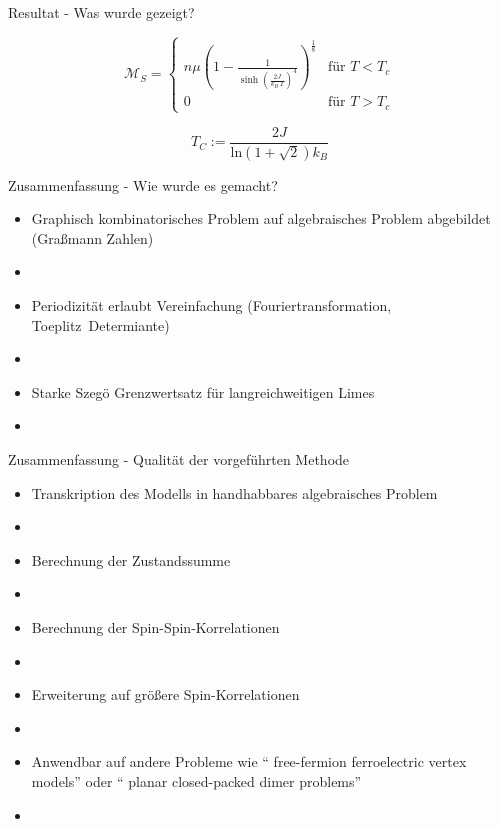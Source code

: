\documentclass[11pt]{beamer}
\renewcommand{\ln}[1]{\mathrm{ln}\left( #1 \right)}
\begin{document}
    \begin{frame}{Resultat - Was wurde gezeigt?}
    
    \begin{grayframe}[frametitle = {Spontane Magnetisierung des 2d Ising-Modells}]
    {\Large
    \begin{equation} \nonumber
    \mathcal{M}_S = \left\{ \begin{array}{cr} n \mu \left(1-\frac{1}{\sinh(\frac{2J}{k_B\,T})^4}\right)^{\frac{1}{8}} & \text{für } T < T_c \\ 0 &\text{für } T > T_c   \end{array} \right.
    \end{equation}}
    
    \begin{equation} \nonumber
    T_C  := \frac{2 J}{ \ln{1+\sqrt{2}} k_B}
    \end{equation}
\end{grayframe}
    
    \end{frame}

    \begin{frame}{Zusammenfassung -  Wie wurde es gemacht?}
    \begin{itemize} 
    \item Graphisch kombinatorisches Problem auf algebraisches Problem abgebildet (Graßmann Zahlen)
    \item[]
    \item Periodizität erlaubt Vereinfachung (Fouriertransformation, Toeplitz~Determiante)
    \item[]
    \item Starke Szegö Grenzwertsatz für
    langreichweitigen Limes
    \item[]
    \end{itemize}
    \end{frame}
    
    \begin{frame}{Zusammenfassung - Qualität der vorgeführten Methode}
    
    \begin{itemize}
    \item Transkription des Modells in handhabbares algebraisches Problem
    \item[]
    \item Berechnung der Zustandssumme
    \item[]
    \item Berechnung der Spin-Spin-Korrelationen
    \item[]
    \item Erweiterung auf größere Spin-Korrelationen
    \item[]
    \item Anwendbar auf andere Probleme wie `` free-fermion ferroelectric vertex models'' oder ``
planar closed-packed dimer problems''
    \item[]
    \end{itemize}
    
    \end{frame}
    
\end{document}

